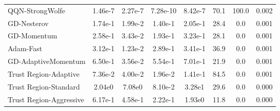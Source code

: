 \documentclass{article}
\begin{document}
\begin{table}[htbp]
{\begin{tabular}{p{2.5cm}*{7}{c}}
QQN-StrongWolfe & 1.46e-7 & 2.27e-7 & 7.28e-10 & 8.42e-7 & 70.1 & 100.0 & 0.002 \\
GD-Nesterov & 1.74e-1 & 1.99e-2 & 1.40e-1 & 2.05e-1 & 28.4 & 0.0 & 0.001 \\
GD-Momentum & 2.58e-1 & 3.43e-2 & 1.93e-1 & 3.23e-1 & 28.1 & 0.0 & 0.001 \\
Adam-Fast & 3.12e-1 & 1.23e-2 & 2.89e-1 & 3.41e-1 & 36.9 & 0.0 & 0.001 \\
GD-AdaptiveMomentum & 6.50e-1 & 3.56e-2 & 5.54e-1 & 7.01e-1 & 21.9 & 0.0 & 0.001 \\
Trust Region-Adaptive & 7.36e-2 & 4.00e-2 & 1.96e-2 & 1.41e-1 & 84.5 & 0.0 & 0.001 \\
Trust Region-Standard & 2.04e0 & 7.08e0 & 8.10e-2 & 3.28e1 & 29.6 & 0.0 & 0.000 \\
Trust Region-Aggressive & 6.17e-1 & 4.58e-1 & 2.22e-1 & 1.93e0 & 11.8 & 0.0 & 0.000 \\
\bottomrule
\end{tabular}
}
\end{table}
\end{document}
